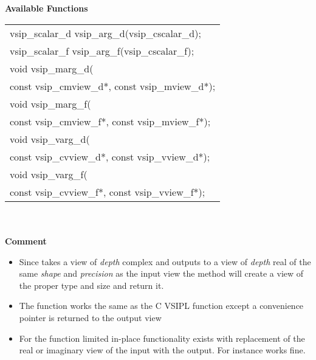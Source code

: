 \\\cvsiplh
\\ \hspace*{.8cm} \vspace*{.1cm} \textbf{Available Functions }
\\ \hspace*{1.1cm} {
\ttfamily
\begin{tabular}[H]{l}
vsip\_scalar\_d vsip\_arg\_d(vsip\_cscalar\_d);\\
vsip\_scalar\_f vsip\_arg\_f(vsip\_cscalar\_f);\\
void vsip\_marg\_d(\\*\hspace{.5cm}const vsip\_cmview\_d*, const vsip\_mview\_d*);\\
void vsip\_marg\_f(\\*\hspace{.5cm}const vsip\_cmview\_f*, const vsip\_mview\_f*);\\
void vsip\_varg\_d(\\*\hspace{.5cm}const vsip\_cvview\_d*, const vsip\_vview\_d*);\\
void vsip\_varg\_f(\\*\hspace{.5cm}const vsip\_cvview\_f*, const vsip\_vview\_f*);\\
\end{tabular}
}
\\\pyjvsiph
{}
\\ \hspace*{.8cm}\textbf{Comment}\\
\hspace*{.8cm}\parbox{11cm}{\vspace*{.2cm}
\begin{itemize}
\item{Since  takes a view of \emph{depth} complex and outputs to a view of \emph{depth} real of the same \emph{shape} and \emph{precision} as the input view the  method will create a view of the proper type and size and return it.}
\item{The  function works the same as the C VSIPL function except a convenience pointer is returned to the output view}
\item{For the function limited in-place functionality exists with replacement of the real or imaginary view of the input with the output. For instance  works fine.}
\end{itemize}}
